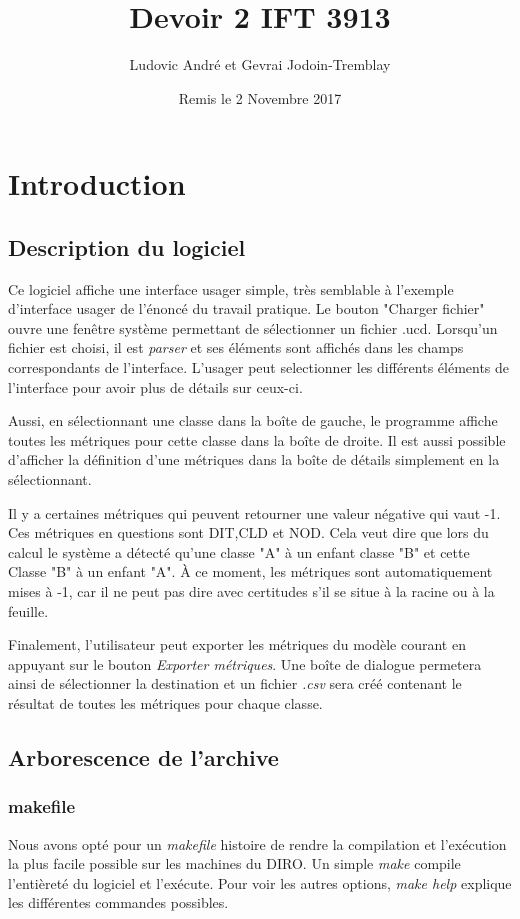 \documentclass[letter,french]{report}
\begin{document}
	\title{Devoir 2 IFT 3913}
	\author{Ludovic André et Gevrai Jodoin-Tremblay}
	\date{Remis le 2 Novembre 2017}
	\maketitle
	
	
  \section*{Introduction}

	\subsection*{Description du logiciel}
	Ce logiciel affiche une interface usager simple, très semblable
	à l'exemple d'interface usager de l'énoncé du travail pratique. Le bouton "Charger
	fichier" ouvre une fenêtre système permettant de sélectionner un fichier .ucd.
	Lorsqu'un fichier est choisi, il est \emph{parser} et ses éléments sont affichés dans
	les champs correspondants de l'interface. L'usager peut selectionner les
  différents éléments de l'interface pour avoir plus de détails sur ceux-ci.

  Aussi, en sélectionnant une classe dans la boîte de gauche, le programme
  affiche toutes les métriques pour cette classe dans la boîte de droite. Il est
  aussi possible d'afficher la définition d'une métriques dans la boîte de
  détails simplement en la sélectionnant.
  
  Il y a certaines métriques qui peuvent retourner une valeur négative qui vaut -1. Ces métriques en questions sont DIT,CLD et NOD. Cela veut dire que lors du calcul le système a détecté qu'une classe "A" à un enfant classe "B" et cette Classe "B" à un enfant "A". À ce moment, les métriques sont automatiquement mises à -1, car il ne peut pas dire avec certitudes s’il se situe à la racine ou à la feuille.

  Finalement, l'utilisateur peut exporter les métriques du modèle courant en
  appuyant sur le bouton \emph{Exporter métriques}. Une boîte de dialogue
  permetera ainsi de sélectionner la destination et un fichier \emph{.csv} sera
  créé contenant le résultat de toutes les métriques pour chaque classe.

  \subsection*{Arborescence de l'archive}
	\subsubsection*{makefile}
	Nous avons opté pour un \emph{makefile} histoire de rendre la compilation et l'exécution
	la plus facile possible sur les machines du DIRO. Un simple \emph{make} compile
	l'entièreté du logiciel et l'exécute. Pour voir les autres options, \emph{make help}
	explique les différentes commandes possibles.
\end{document}
